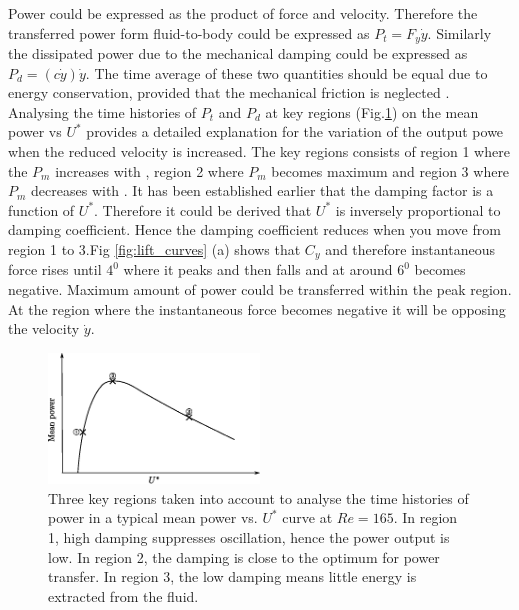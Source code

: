   


 



 
 Power could be expressed as the product of force and velocity. Therefore the transferred power form fluid-to-body could be expressed as $P_t=F_y\dot{y}$. Similarly the dissipated power due to the mechanical damping could be expressed as $P_d=(c\dot{y})\dot{y}$. The time average of these two quantities should be equal due to energy conservation, provided that the mechanical friction is neglected . Analysing the  time histories of $P_t $ and $P_d$ at key regions (Fig.\ref{fig:regions_1}) on the mean power vs $U^*$ provides a detailed explanation for the variation of the output powe when the reduced velocity is increased. The key regions consists of region 1 where the $P_m$ increases with \ustar, region 2 where $P_m$ becomes maximum and region 3 where $P_m$ decreases with \ustar. It has been established earlier that the damping factor is a function of $U^*$. Therefore it could be derived that $U^*$ is inversely proportional to damping coefficient. Hence the damping coefficient reduces when you move from region 1 to 3.Fig \ref{fig:lift_curves} (a) shows that $C_y$ and therefore instantaneous force rises until $4^0$ where it peaks and then falls and at around $6^0$ becomes negative. Maximum amount of power could be transferred within the peak region. At the region where the instantaneous force becomes negative it will be opposing the velocity $\dot{y}$.  

\begin{figure}[h!]
\centering
\includegraphics[width=0.5\textwidth]{../FnP/sketch_1}
\caption{ Three key regions taken into account to analyse the time histories of power in a typical mean power vs. $U^*$ curve at $Re=165$. In region 1, high damping suppresses oscillation, hence the power output is low. In region 2, the damping is close to the optimum for power transfer. In region 3, the low damping means little energy is extracted from the fluid.}
\label{fig:regions_1}
\end{figure}


